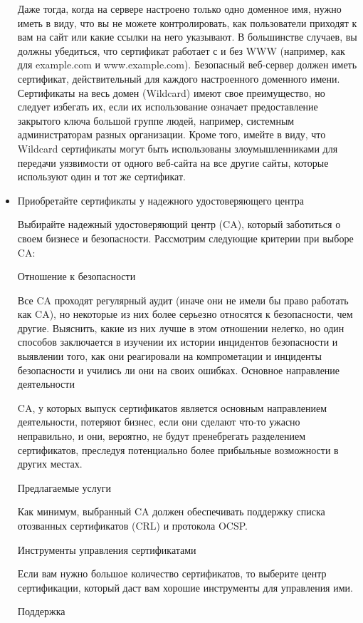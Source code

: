 \documentclass[11pt, a4paper]{article}		%
\begin{document}
\begin{itemize}
Даже тогда, когда на сервере настроено только одно доменное имя, нужно иметь в виду, что вы не можете контролировать, как пользователи приходят к вам на сайт или какие ссылки на него указывают. В большинстве случаев, вы должны убедиться, что сертификат работает с и без WWW (например, как для example.com и www.example.com). Безопасный веб-сервер должен иметь сертификат, действительный для каждого настроенного доменного имени. Сертификаты на весь домен (Wildcard) имеют свое преимущество, но следует избегать их, если их использование означает предоставление закрытого ключа большой группе людей, например, системным администраторам разных организации. Кроме того, имейте в виду, что Wildcard сертификаты могут быть использованы злоумышленниками для передачи уязвимости от одного веб-сайта на все другие сайты, которые используют один и тот же сертификат. 

\item Приобретайте сертификаты у надежного удостоверяющего центра

Выбирайте надежный удостоверяющий центр (CA), который заботиться о своем бизнесе и безопасности. Рассмотрим следующие критерии при выборе CA:

Отношение к безопасности

Все CA проходят регулярный аудит (иначе они не имели бы право работать как CA), но некоторые из них более серьезно относятся к безопасности, чем другие. Выяснить, какие из них лучше в этом отношении нелегко, но один способов заключается в изучении их истории инцидентов безопасности и выявлении того, как они реагировали на компрометации и инциденты безопасности и учились ли они на своих ошибках.
Основное направление деятельности

CA, у которых выпуск сертификатов является основным направлением деятельности, потеряют бизнес, если они сделают что-то ужасно неправильно, и они, вероятно, не будут пренебрегать разделением сертификатов, преследуя потенциально более прибыльные возможности в других местах.

Предлагаемые услуги

Как минимум, выбранный CA должен обеспечивать поддержку списка отозванных сертификатов (CRL) и протокола OCSP. 

Инструменты управления сертификатами

Если вам нужно большое количество сертификатов, то выберите центр сертификации, который даст вам хорошие инструменты для управления ими.

Поддержка


\end{itemize}
\end{document}

